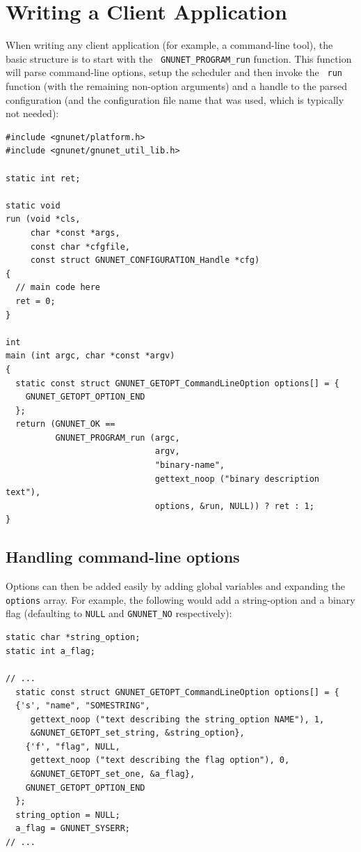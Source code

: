 \documentclass[10pt]{article}
\begin{document}
\section{Writing a Client Application}

When writing any client application (for example, a command-line
tool), the basic structure is to start with the {\tt
  GNUNET\_PROGRAM\_run} function.  This function will parse
command-line options, setup the scheduler and then invoke the {\tt
  run} function (with the remaining non-option arguments) and a handle
to the parsed configuration (and the configuration file name that was
used, which is typically not needed):

\lstset{language=C}
\begin{lstlisting}
#include <gnunet/platform.h>
#include <gnunet/gnunet_util_lib.h>

static int ret;

static void
run (void *cls,
     char *const *args,
     const char *cfgfile,
     const struct GNUNET_CONFIGURATION_Handle *cfg)
{
  // main code here
  ret = 0;
}

int
main (int argc, char *const *argv)
{
  static const struct GNUNET_GETOPT_CommandLineOption options[] = {
    GNUNET_GETOPT_OPTION_END
  };
  return (GNUNET_OK ==
          GNUNET_PROGRAM_run (argc,
                              argv,
                              "binary-name",
                              gettext_noop ("binary description text"),
                              options, &run, NULL)) ? ret : 1;
}
\end{lstlisting}

\subsection{Handling command-line options}

Options can then be added easily by adding global variables and
expanding the {\tt options} array.  For example, the following would
add a string-option and a binary flag (defaulting to {\tt NULL} and
{\tt GNUNET\_NO} respectively):

\lstset{language=C}
\begin{lstlisting}
static char *string_option;
static int a_flag;

// ...
  static const struct GNUNET_GETOPT_CommandLineOption options[] = {
  {'s', "name", "SOMESTRING",
     gettext_noop ("text describing the string_option NAME"), 1,
     &GNUNET_GETOPT_set_string, &string_option},
    {'f', "flag", NULL,
     gettext_noop ("text describing the flag option"), 0,
     &GNUNET_GETOPT_set_one, &a_flag},
    GNUNET_GETOPT_OPTION_END
  };
  string_option = NULL;
  a_flag = GNUNET_SYSERR;
// ...
\end{lstlisting}
\end{document}
